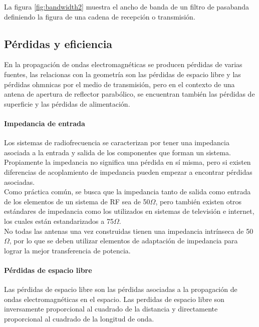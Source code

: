 La figura \ref{fig:bandwidth2} muestra el ancho de banda de un filtro de pasabanda definiendo la figura de una cadena de recepción o transmisión.\\


\subsection{Pérdidas y eficiencia}

En la propagación de ondas electromagnéticas se producen pérdidas de varias fuentes, las relacionas con la geometría son las pérdidas de espacio libre y las pérdidas ohmnicas por el medio de transmisión, pero en el contexto de una antena de apertura de reflector parabólico, se encuentran también las pérdidas de superficie y las pérdidas de alimentación.\\

\paragraph{Impedancia de entrada}

Los sistemas de radiofrecuencia se caracterizan por tener una impedancia asociada a la entrada y salida de los componentes que forman un sistema. Propiamente la impedancia no significa una pérdida en sí misma, pero si existen diferencias de acoplamiento de impedancia pueden empezar a encontrar pérdidas asociadas.\\

Como práctica común, se busca que la impedancia tanto de salida como entrada de los elementos de un sistema de RF sea de 50$\Omega$, pero también existen otros estándares de impedancia como los utilizados en sistemas de televisión e internet, los cuales están estandarizados a 75$\Omega$.\\

No todas las antenas una vez construidas tienen una impedancia intrínseca de 50$\Omega$, por lo que se deben utilizar elementos de adaptación de impedancia para lograr la mejor transferencia de potencia.\\

\paragraph{Pérdidas de espacio libre}

Las pérdidas de espacio libre son las pérdidas asociadas a la propagación de ondas electromagnéticas en el espacio. Las perdidas de espacio libre son inversamente proporcional al cuadrado de la distancia y directamente proporcional al cuadrado de la longitud de onda.\\

